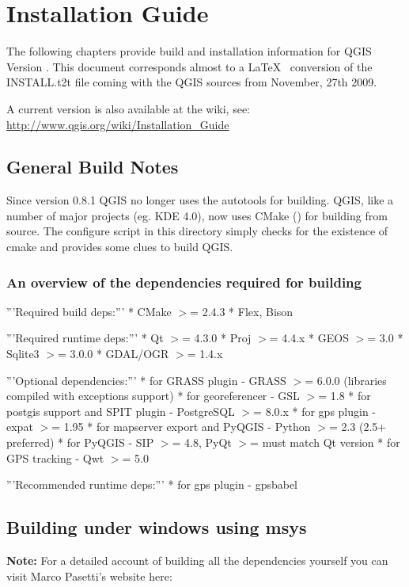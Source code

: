 
\section{Installation Guide}\label{label_install}


The following chapters provide build and installation information for QGIS
Version \CURRENT. This document corresponds almost to a \LaTeX~ conversion of
the INSTALL.t2t file coming with the QGIS sources from November, 27th 2009.

A current version is also available at the wiki, see:
\url{http://www.qgis.org/wiki/Installation_Guide}

\subsection{General Build Notes}
Since version 0.8.1 QGIS no longer uses the autotools for building. QGIS, like a
number of major projects (eg. KDE 4.0), now uses CMake ()
for building from source. The configure script in this directory simply checks
for the existence of cmake and provides some clues to build QGIS.

\subsubsection{An overview of the dependencies required for building}
'''Required build deps:'''
* CMake $>$= 2.4.3
* Flex, Bison

'''Required runtime deps:'''
* Qt $>$= 4.3.0
* Proj $>$= 4.4.x
* GEOS $>$= 3.0
* Sqlite3 $>$= 3.0.0
* GDAL/OGR $>$= 1.4.x

'''Optional dependencies:'''
* for GRASS plugin - GRASS $>$= 6.0.0 (libraries compiled with exceptions support)
* for georeferencer - GSL $>$= 1.8
* for postgis support and SPIT plugin - PostgreSQL $>$= 8.0.x
* for gps plugin - expat $>$= 1.95
* for mapserver export and PyQGIS - Python $>$= 2.3 (2.5+ preferred)
* for PyQGIS - SIP $>$= 4.8, PyQt $>$= must match Qt version
* for GPS tracking - Qwt $>$= 5.0

'''Recommended runtime deps:'''
* for gps plugin - gpsbabel


\subsection{Building under windows using msys}
\textbf{Note:} For a detailed account of building all the dependencies yourself you 
can visit Marco Pasetti's website here:

